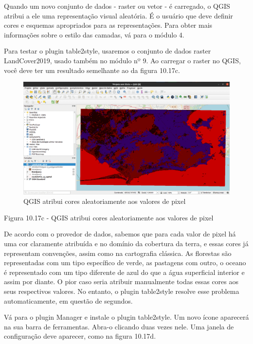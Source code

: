 \documentclass[
]{krantz}
\begin{document}
Quando um novo conjunto de dados - raster ou vetor - é carregado, o QGIS atribui a ele uma representação visual aleatória. É o usuário que deve definir cores e esquemas apropriados para as representações. Para obter mais informações sobre o estilo das camadas, vá para o módulo 4.

Para testar o plugin table2style, usaremos o conjunto de dados raster LandCover2019, usado também no módulo nº 9. Ao carregar o raster no QGIS, você deve ter um resultado semelhante ao da figura 10.17c.

\begin{figure}
\centering
\includegraphics{media/modulo10/fig1017_c.png}
\caption{QGIS atribui cores aleatoriamente aos valores de pixel}
\end{figure}

Figura 10.17c - QGIS atribui cores aleatoriamente aos valores de pixel

De acordo com o provedor de dados, sabemos que para cada valor de pixel há uma cor claramente atribuída e no domínio da cobertura da terra, e essas cores já representam convenções, assim como na cartografia clássica. As florestas são representadas com um tipo específico de verde, as pastagens com outro, o oceano é representado com um tipo diferente de azul do que a água superficial interior e assim por diante. O pior caso seria atribuir manualmente todas essas cores aos seus respectivos valores. No entanto, o plugin table2style resolve esse problema automaticamente, em questão de segundos.

Vá para o plugin Manager e instale o plugin table2style. Um novo ícone aparecerá na sua barra de ferramentas. Abra-o clicando duas vezes nele. Uma janela de configuração deve aparecer, como na figura 10.17d.
\end{document}
